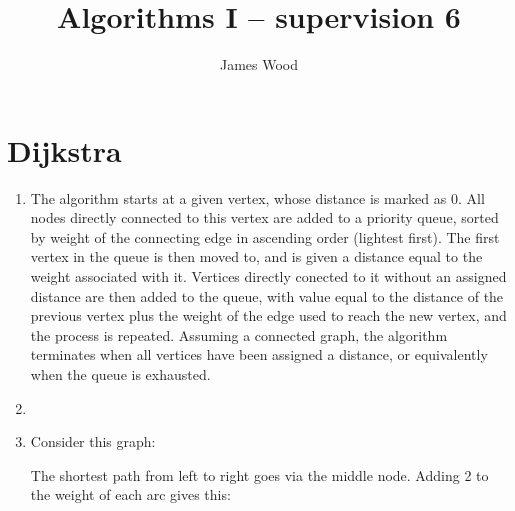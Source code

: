 \documentclass[11pt]{article}
\title{\textbf{Algorithms I -- supervision 6}}
\author{James Wood}
\begin{document}
\renewcommand{\labelenumi}{(\alph{enumi})}
\renewcommand{\labelenumii}{(\roman{enumii})}

\maketitle

\section{Dijkstra}
\begin{enumerate}
\item The algorithm starts at a given vertex, whose distance is marked as 0. All nodes directly connected to this vertex are added to a priority queue, sorted by weight of the connecting edge in ascending order (lightest first). The first vertex in the queue is then moved to, and is given a distance equal to the weight associated with it. Vertices directly conected to it without an assigned distance are then added to the queue, with value equal to the distance of the previous vertex plus the weight of the edge used to reach the new vertex, and the process is repeated. Assuming a connected graph, the algorithm terminates when all vertices have been assigned a distance, or equivalently when the queue is exhausted.
\item
\item Consider this graph:


  The shortest path from left to right goes via the middle node. Adding 2 to the weight of each arc gives this:


\end{enumerate}
\end{document}

